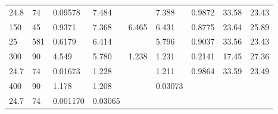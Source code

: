 \begin{small}
\begin{supertabular}{p{1.1cm}p{1.1cm}p{1.3cm}p{1.3cm}p{1.3cm}p{1.3cm}p{1.3cm}p{1.3cm}p{1.3cm}}
24.8 & 74 & 0.09578 & 7.484 &  & 7.388 & 0.9872 & 33.58 & 23.43 \\
150 & 45 & 0.9371 & 7.368 & 6.465 & 6.431 & 0.8775 & 23.64 & 25.89 \\
25 & 581 & 0.6179 & 6.414 &  & 5.796 & 0.9037 & 33.56 & 23.43 \\
300 & 90 & 4.549 & 5.780 & 1.238 & 1.231 & 0.2141 & 17.45 & 27.36 \\
24.7 & 74 & 0.01673 & 1.228 &  & 1.211 & 0.9864 & 33.59 & 23.49 \\
400 & 90 & 1.178 & 1.208 &  & 0.03073 &  &  &  \\
24.7 & 74 & 0.001170 & 0.03065 &  &  &  &  &  \\
\end{supertabular}
\end{small}

\clearpage

